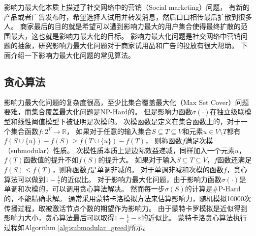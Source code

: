 影响力最大化本质上描述了社交网络中的营销（Social marketing）问题，
有新的产品或者广告发布时，希望选择人试用并转发消息，然后口口相传最后扩散到很多人。
商家最后的目的就是希望可以遭到影响力最大的用户集合使得最终扩散的范围最大，这也就是影响力最大化的目标。
影响力最大化问题是社交网络中营销问题的抽象，研究影响力最大化问题对于商家试用品和广告的投放有很大帮助。
下面介绍一下影响力最大化问题的常见算法。

\subsection{贪心算法}
影响力最大化问题的复杂度很高，至少比集合覆盖最大化（Max Set Cover）问题要难，而集合覆盖最大化问题是NP-Hard的。
但是影响力函数$\sigma(\cdot)$在独立级联模型和线性阈值模型下被证明是次模的\cite{Kempe2003maximizing}。
次模函数是定义在集合函数上的，对于一个集合函数$f:2^V \to \mathbb{R}$，
如果对于任意的输入集合$S \subseteq T \subseteq V$和元素$u \in V \setminus T$都有
$f(S \cup \{u\}) - f(S) \geq f(T \cup \{u\}) - f(T)$，
则称函数$f$满足次模（submodular）性质。
次模性质本质上是边际效益递减，同样加入一个元素$u$，$f(T)$函数值的提升不如$f(S)$的提升大。
如果对于输入$S \subseteq T \subseteq V$，$f$函数还满足$f(S) \leq f(T)$，则称函数$f$是单调非减的。
对于单调非减和次模的函数$f$，贪心算法可以做到$1-\frac{1}{e}$的近似比。
对于影响力最大化问题，由于影响力函数$\sigma(\cdot)$是单调和次模的，可以调用贪心算法解决。
然而每一步$\sigma(S)$的计算是$\#$P-Hard的，不能精确求解。
通常采用蒙特卡洛模拟方法来估算影响力，随机模拟10000次传播过程，取被激活节点个数的期望作为影响力。
由于蒙特卡罗模拟是近似得到影响力大小，贪心算法最后可以取得$1-\frac{1}{e}-\varepsilon$的近似比。
蒙特卡洛贪心算法执行过程如Algorithm \ref{alg:submodular_greed}所示。


